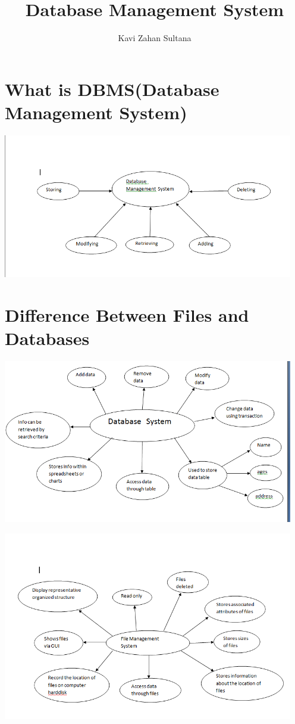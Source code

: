 \documentclass{article}
\begin{document}
\title{\large\textbf{Database Management System}}

\author{Kavi Zahan Sultana}

\maketitle

\newpage

\tableofcontents

\newpage

\section{What is DBMS(Database Management System)}

\includegraphics[width=5in]{dbms.png}


\section{Difference Between Files and Databases}

\includegraphics[width=5in]{dbms1.png}

\includegraphics[width=5in]{dbms2.png}
\end{document}
